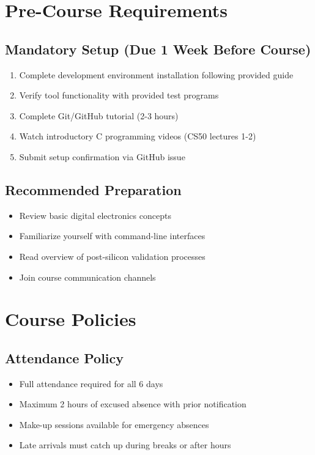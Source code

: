 \documentclass[11pt,a4paper]{article}
\begin{document}
\section{Pre-Course Requirements}

\subsection{Mandatory Setup (Due 1 Week Before Course)}
\begin{enumerate}
    \item Complete development environment installation following provided guide
    \item Verify tool functionality with provided test programs
    \item Complete Git/GitHub tutorial (2-3 hours)
    \item Watch introductory C programming videos (CS50 lectures 1-2)
    \item Submit setup confirmation via GitHub issue
\end{enumerate}

\subsection{Recommended Preparation}
\begin{itemize}
    \item Review basic digital electronics concepts
    \item Familiarize yourself with command-line interfaces
    \item Read overview of post-silicon validation processes
    \item Join course communication channels
\end{itemize}

\section{Course Policies}

\subsection{Attendance Policy}
\begin{itemize}
    \item Full attendance required for all 6 days
    \item Maximum 2 hours of excused absence with prior notification
    \item Make-up sessions available for emergency absences
    \item Late arrivals must catch up during breaks or after hours
\end{itemize}
\end{document}
